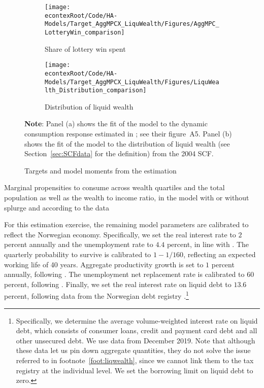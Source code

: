 \documentclass[\econtexRoot/HAFiscal]{subfiles}
\begin{document}
\begin{figure}[htb]
  \centering
  \begin{subfigure}[b]{.48\linewidth}
    \centering
    \texttt{[image: \\econtexRoot/Code/HA-Models/Target\_AggMPCX\_LiquWealth/Figures/AggMPC\_LotteryWin\_comparison]}
    \caption{Share of lottery win spent}
    \notinsubfile{\label{fig:aggmpclotterywin}}
  \end{subfigure}
  \begin{subfigure}[b]{.48\linewidth}
    \centering
    \texttt{[image: \\econtexRoot/Code/HA-Models/Target\_AggMPCX\_LiquWealth/Figures/LiquWealth\_Distribution\_comparison]}
    \caption{Distribution of liquid wealth}
    \notinsubfile{\label{fig:liquwealthdistribution}}
  \end{subfigure}%
  \caption{Targets and model moments from the estimation}
  \notinsubfile{\label{fig:splurge_estimation}}
  \parbox{16cm}{\small \vspace{.15cm} \textbf{Note}: Panel (a) shows the fit of the model to the dynamic consumption response estimated in \citet{fagereng_mpc_2021}; see their figure~A5. Panel (b) shows the fit of the model to the distribution of liquid wealth (see Section~\ref{sec:SCFdata} for the definition) from the 2004 SCF.\normalsize}
\end{figure}



\begin{table}[t]
  \center
  
  \caption{Marginal propensities to consume across wealth quartiles and the total population as well as the wealth to income ratio, in the model with or without splurge and according to the data}
  \notinsubfile{\label{tab:ComparisonSplurge}}
\end{table}


For this estimation exercise, the remaining model parameters are calibrated to reflect the Norwegian economy. Specifically, we set the real interest rate to $2$ percent annually and the unemployment rate to $4.4$ percent, in line with \citet{aursland_state-dependent_2020}. The quarterly probability to survive is calibrated to $1-1/160$, reflecting an expected working life of 40 years. Aggregate productivity growth is set to $1$ percent annually, following \citet{kravik_navigating_2019}. The unemployment net replacement rate is calibrated to $60$ percent, following \citet{oecd_net_2020}. Finally, we set the real interest rate on liquid debt to $13.6$ percent, following data from the Norwegian debt registry \citet{gjeldsregistret_nokkeltall_2022}.\footnote{Specifically, we determine the average volume-weighted interest rate on liquid debt, which consists of consumer loans, credit and payment card debt and all other unsecured debt. We use data from December 2019. Note that although these data let us pin down aggregate quantities, they do not solve the issue referred to in footnote~\ref{foot:liqwealth}, since we cannot link them to the tax registry at the individual level. We set the borrowing limit on liquid debt to zero.}
\end{document}
